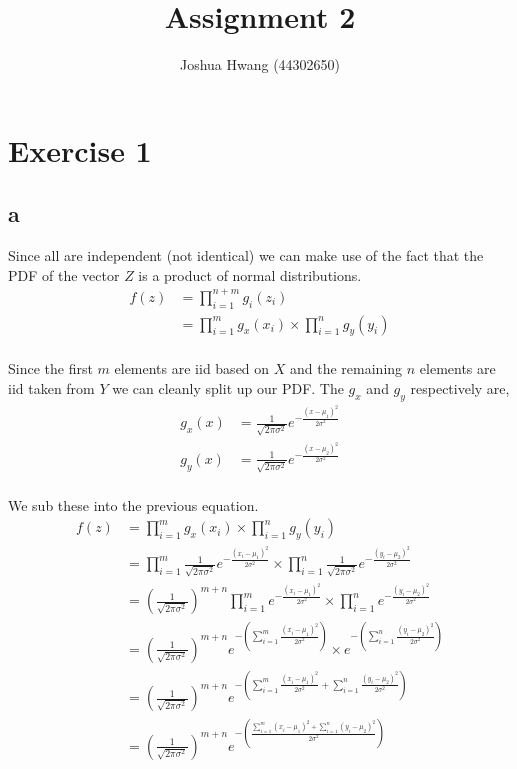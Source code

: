 \documentclass{article}
\title{Assignment 2}
\author{Joshua Hwang (44302650)}
\begin{document}
\section{Exercise 1}
\subsection{a}
Since all are independent (not identical) we can make use of the fact that the
PDF of the vector $Z$ is a product of normal distributions.
\begin{align*}
    f(z) &= \prod_{i=1}^{n+m} g_i (z_i) \\
    &= \prod_{i=1}^m g_x (x_i) \times \prod_{i=1}^n g_y (y_i) \\
\end{align*}

Since the first $m$ elements are iid based on $X$ and the remaining $n$ elements
are iid taken from $Y$ we can cleanly split up our PDF\@. The $g_x$ and $g_y$
respectively are,
\begin{align*}
    g_x(x) &= \frac{1}{\sqrt{2\pi\sigma^2}} e^{-\frac{{(x-\mu_1)}^2}{2\sigma^2}} \\
    g_y (x) &= \frac{1}{\sqrt{2\pi\sigma^2}} e^{-\frac{{(x-\mu_2)}^2}{2\sigma^2}} \\
\end{align*}

We sub these into the previous equation.
\begin{align*}
    f(z) &= \prod_{i=1}^m g_x (x_i) \times \prod_{i=1}^n g_y (y_i) \\
    &= \prod_{i=1}^m \frac{1}{\sqrt{2\pi\sigma^2}} e^{-\frac{{(x_i-\mu_1)}^2}{2\sigma^2}}
    \times \prod_{i=1}^n \frac{1}{\sqrt{2\pi\sigma^2}} e^{-\frac{{(y_i-\mu_2)}^2}{2\sigma^2}} \\
    &= {\left(\frac{1}{\sqrt{2\pi\sigma^2}}\right)}^{m+n}
    \prod_{i=1}^m e^{-\frac{{(x_i-\mu_1)}^2}{2\sigma^2}}
    \times \prod_{i=1}^n e^{-\frac{{(y_i-\mu_2)}^2}{2\sigma^2}} \\
    &= {\left(\frac{1}{\sqrt{2\pi\sigma^2}}\right)}^{m+n}
    e^{-\left(\sum_{i=1}^m \frac{{(x_i-\mu_1)}^2}{2\sigma^2}\right)}
    \times e^{-\left(\sum_{i=1}^n \frac{{(y_i-\mu_2)}^2}{2\sigma^2}\right)} \\
    &= {\left(\frac{1}{\sqrt{2\pi\sigma^2}}\right)}^{m+n}
    e^{-\left(\sum_{i=1}^m \frac{{(x_i-\mu_1)}^2}{2\sigma^2}
    + \sum_{i=1}^n \frac{{(y_i-\mu_2)}^2}{2\sigma^2}\right)} \\
    &= {\left(\frac{1}{\sqrt{2\pi\sigma^2}}\right)}^{m+n}
    e^{-\left(\frac{{\sum_{i=1}^m (x_i-\mu_1)}^2 + {\sum_{i=1}^n (y_i-\mu_2)}^2}
    {2\sigma^2}\right)} \\
\end{align*}
\end{document}
